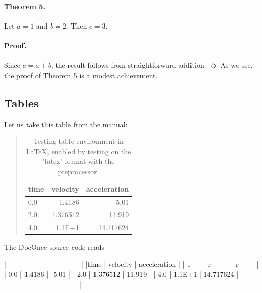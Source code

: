 \documentclass[%
oneside,                 %
final,                   %
10pt]{article}
\theoremstyle{definition}
\begin{document}
\begin{enumerate}
\paragraph{Theorem 5.}
Let $a=1$ and $b=2$. Then $c=3$.
\paragraph{Proof.}
Since $c=a+b$, the result follows from straightforward addition.
$\Diamond$
As we see, the proof of Theorem 5 is a modest
achievement.
\subsection{Tables}
\label{subsec:table}
Let us take this table from the manual:
\begin{table}
\caption{
Testing table environment in {\LaTeX}, enabled by testing on the "latex" format
with the preprocessor.
\label{mytab}
}
\begin{quote}
\begin{tabular}{lrr}
\hline
\multicolumn{1}{c}{ time } & \multicolumn{1}{c}{ velocity } & \multicolumn{1}{c}{ acceleration } \\
\hline
0.0  & 1.4186   & -5.01        \\
2.0  & 1.376512 & 11.919       \\
4.0  & 1.1E+1   & 14.717624    \\
\hline
\end{tabular}
\end{quote}
\noindent
\end{table}
The DocOnce source code reads
\bccq

  |--------------------------------|
  |time  | velocity | acceleration |
  |--l--------r-----------r--------|
  | 0.0  | 1.4186   | -5.01        |
  | 2.0  | 1.376512 | 11.919       |
  | 4.0  | 1.1E+1   | 14.717624    |
  |--------------------------------|


\eccq


\end{enumerate}
\end{document}
